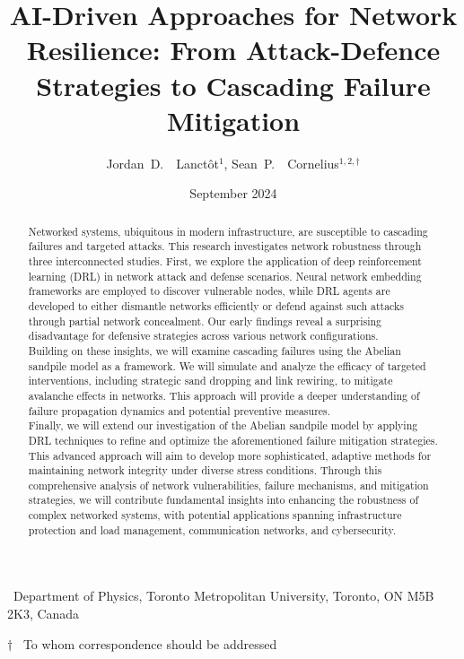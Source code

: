 \title{AI-Driven Approaches for Network Resilience: From Attack-Defence Strategies to Cascading Failure Mitigation}
\author{Jordan~D.~~Lanct\^{o}t$^{1}$, Sean~P.~~Cornelius$^{1,2, \dagger}$}
\date{September 2024}

\maketitle
\thispagestyle{noNumber}

{\small
\begin{affiliations}
 \item \, Department of Physics, Toronto Metropolitan University, Toronto, ON M5B 2K3, Canada
 \item[$\dagger$] \, To whom correspondence should be addressed
\end{affiliations}
}

\vspace{3em}
\begin{abstract}
Networked systems, ubiquitous in modern infrastructure, are susceptible to cascading failures and targeted attacks. This research investigates network robustness through three interconnected studies. First, we explore the application of deep reinforcement learning (DRL) in network attack and defense scenarios. Neural network embedding frameworks are employed to discover vulnerable nodes, while DRL agents are developed to either dismantle networks efficiently or defend against such attacks through partial network concealment. Our early findings reveal a surprising disadvantage for defensive strategies across various network configurations.\\

Building on these insights, we will examine cascading failures using the Abelian sandpile model as a framework. We will simulate and analyze the efficacy of targeted interventions, including strategic sand dropping and link rewiring, to mitigate avalanche effects in networks. This approach will provide a deeper understanding of failure propagation dynamics and potential preventive measures.\\

Finally, we will extend our investigation of the Abelian sandpile model by applying DRL techniques to refine and optimize the aforementioned failure mitigation strategies. This advanced approach will aim to develop more sophisticated, adaptive methods for maintaining network integrity under diverse stress conditions. Through this comprehensive analysis of network vulnerabilities, failure mechanisms, and mitigation strategies, we will contribute fundamental insights into enhancing the robustness of complex networked systems, with potential applications spanning infrastructure protection and load management, communication networks, and cybersecurity.
\end{abstract}